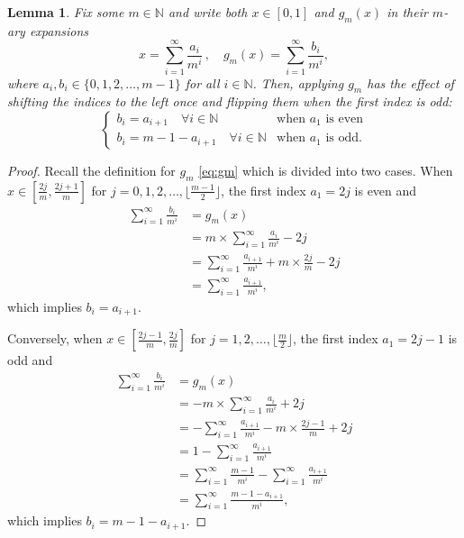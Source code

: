 \documentclass[a4paper]{article}
\newtheorem{lemma}[theorem]{Lemma}%
\theoremstyle{definition}
\numberwithin{equation}{section}
\numberwithin{theorem}{section}
\begin{document}
{\begin{lemma} \label{lm:gmshifting}
    Fix some $m\in\mathbb{N}$ and write both $x\in[0,1]$ and $g_m(x)$ in their $m$-ary expansions
    \begin{equation*}
        x = \sum_{i=1}^{\infty}\frac{a_i}{m^i}\,, \quad g_m(x) = \sum_{i=1}^{\infty}\frac{b_i}{m^i},
    \end{equation*}
    where $a_i, b_i\in\{0,1,2,\dots,m-1\}$ for all $i\in\mathbb{N}$. Then, applying $g_m$ has the effect of shifting the indices to the left once and flipping them when the first index is odd:
    \begin{equation}
        \begin{cases}
            b_i = a_{i+1} \quad\forall i\in\mathbb{N} & \text{when $a_1$ is even} \\
            b_i = m-1-a_{i+1}\quad\forall i\in\mathbb{N} & \text{when $a_1$ is odd.}
        \end{cases}
    \end{equation}
\end{lemma}
\begin{proof}
    Recall the definition for $g_m$ \eqref{eq:gm} which is divided into two cases. When $x\in[\frac{2j}{m},\frac{2j+1}{m}]$ for $j=0,1,2,\dots,\lfloor\frac{m-1}{2}\rfloor$, the first index $a_1 = 2j$ is even and
    \begin{align*}
        \sum_{i=1}^{\infty}\frac{b_i}{m^i} &= g_m(x) \\
        &= m\times\sum_{i=1}^{\infty}\frac{a_i}{m^i} - 2j \\
        &= \sum_{i=1}^{\infty}\frac{a_{i+1}}{m^i} + m\times\frac{2j}{m} - 2j \\
        &= \sum_{i=1}^{\infty}\frac{a_{i+1}}{m^i},
    \end{align*}
    which implies $b_i = a_{i+1}$.

    Conversely, when $x\in[\frac{2j-1}{m},\frac{2j}{m}]$ for $j=1,2,\dots,\lfloor\frac{m}{2}\rfloor$, the first index $a_1 = 2j-1$ is odd and
    \begin{align*}
        \sum_{i=1}^{\infty}\frac{b_i}{m^i} &= g_m(x) \\
        &= -m\times\sum_{i=1}^{\infty}\frac{a_i}{m^i} + 2j \\
        &= -\sum_{i=1}^{\infty}\frac{a_{i+1}}{m^i} - m\times\frac{2j-1}{m} + 2j \\
        &= 1-\sum_{i=1}^{\infty}\frac{a_{i+1}}{m^i} \\
        &= \sum_{i=1}^{\infty}\frac{m-1}{m^i} - \sum_{i=1}^{\infty}\frac{a_{i+1}}{m^i}\\
        &= \sum_{i=1}^{\infty}\frac{m-1-a_{i+1}}{m^i},
    \end{align*}
    which implies $b_i = m-1-a_{i+1}$.
\end{proof}

}
\end{document}
